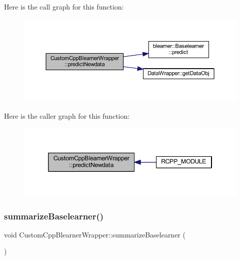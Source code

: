 Here is the call graph for this function\+:\nopagebreak
\begin{figure}[H]
\begin{center}
\leavevmode
\includegraphics[width=350pt]{class_custom_cpp_blearner_wrapper_abc89ab2789f72dad6eccdcdfa01ecbc4_cgraph}
\end{center}
\end{figure}
Here is the caller graph for this function\+:\nopagebreak
\begin{figure}[H]
\begin{center}
\leavevmode
\includegraphics[width=346pt]{class_custom_cpp_blearner_wrapper_abc89ab2789f72dad6eccdcdfa01ecbc4_icgraph}
\end{center}
\end{figure}
\mbox{\label{class_custom_cpp_blearner_wrapper_a832effb3868e124cb149fd06e6033304}} 
\subsubsection{\texorpdfstring{summarize\+Baselearner()}{summarizeBaselearner()}}
{\footnotesize\ttfamily void Custom\+Cpp\+Blearner\+Wrapper\+::summarize\+Baselearner (\begin{DoxyParamCaption}{ }\end{DoxyParamCaption})\hspace{0.3cm}{\ttfamily [inline]}}

